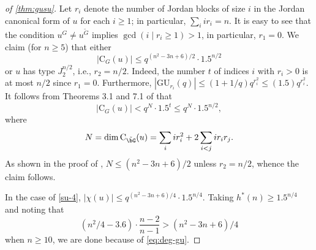 \documentclass[eqthmnum,nocolour,skinny]{jt-calcs}
\newcommand{\GU}{\ensuremath{\mathrm{GU}}}
\newcommand{\CB}{\mathrm {C}}
\begin{document}
\begin{proof}[of \cref{thm:gusu}]
Let $r_i$ denote the number of Jordan blocks of size $i$ in the Jordan canonical form of $u$ for each $i \geq 1$;
in particular, $\sum_i ir_i = n$. It is easy to see that the condition $u^G \neq u^{\tilde G}$ implies
$\gcd(i \mid r_i \geq 1) > 1$, in particular, $r_1 = 0$. We claim (for $n \geq 5$) that either
\begin{equation}\label{su-4}
  |\CB_G(u)| \leq q^{(n^2-3n+6)/2} \cdot 1.5^{n/2}
\end{equation}
or $u$ has type $J_2^{n/2}$, i.e., $r_2 = n/2$. Indeed, the number $t$ of indices $i$ with $r_i > 0$ is at most $n/2$ since $r_1 = 0$.
Furthermore, $|\GU_{r_i}(q)| \leq (1+1/q)q^{r_i^2} \leq (1.5)q^{r_i^2}$.
It follows from Theorems 3.1 and 7.1 of \cite{LS} that
\begin{equation*}
|\CB_G(u)| < q^N \cdot 1.5^t \leq q^N \cdot 1.5^{n/2},
\end{equation*}
where
\begin{equation*}
N = \dim \CB_{\tilde \bG}(u) = \sum_i ir_i^2 + 2\sum_{i < j}ir_ir_j.
\end{equation*}
As shown in the proof of \cite[Thm.~1.5]{bezrukavnikov-liebeck-shalev-tiep:2017:character-bounds-grps-Lie-type}, $N \leq (n^2-3n+6)/2$
unless $r_2 = n/2$, whence the claim follows.

In the case of \eqref{su-4}, $|\chi(u)| \leq q^{(n^2-3n+6)/4} \cdot 1.5^{n/4}$. Taking $h^*(n) \geq 1.5^{n/4}$ and noting that
\begin{equation*}
(n^2/4 - 3.6) \cdot \frac{n-2}{n-1} > (n^2-3n+6)/4
\end{equation*}
when $n \geq 10$, we are done because of \eqref{eq:deg-gu}.


\end{proof}
\end{document}
